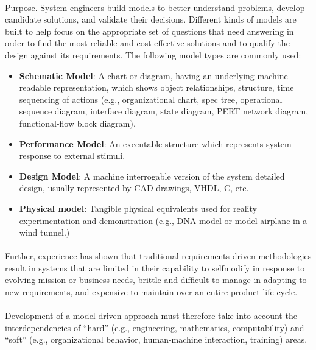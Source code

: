 \documentclass[a4paper,12pt,twoside]{report}
\begin{document}
{			\paragraph{} {Purpose. System engineers build models to better understand problems, develop candidate solutions, and validate their decisions. Different kinds of models are built to help focus on the appropriate set of questions that need answering in order to find the most reliable and cost effective solutions and to qualify the design against its requirements. The following model types are commonly used:
				\begin{itemize}
					\item \textbf{Schematic Model}: A chart or diagram, having an underlying machine-readable representation, which shows object relationships, structure, time sequencing of actions (e.g., organizational chart, spec tree, operational sequence diagram, interface diagram, state diagram, PERT network diagram, functional-flow block diagram).
					\item \textbf{Performance Model}: An executable structure which represents system response to external stimuli.
					\item \textbf{Design Model}: A machine interrogable version of the system detailed design, usually represented by CAD drawings, VHDL, C, etc.
					\item  \textbf{Physical model}: Tangible physical equivalents used for reality experimentation and demonstration (e.g., DNA model or model airplane in a wind tunnel.)
				\end{itemize}
			}
			\paragraph{}{Further, experience has shown that traditional requirements-driven methodologies result in systems that are limited in their capability to selfmodify in response to evolving mission or business needs, brittle and difficult to manage in adapting to new requirements, and expensive to maintain over an entire product life cycle.
			}
			
			\paragraph{} {Development of a model-driven approach must therefore take into account the interdependencies of “hard” (e.g., engineering, mathematics, computability) and “soft” (e.g., organizational behavior, human-machine interaction, training) areas. \cite{FoundationalConceptsMDSD}
			}
			
}
\end{document}
